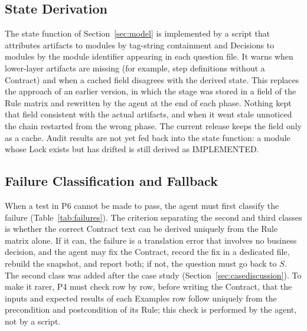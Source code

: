 \documentclass[conference]{IEEEtran}
\begin{document}
\subsection{State Derivation}\label{sec:state}

The state function of Section~\ref{sec:model} is implemented by a script that attributes artifacts to modules by tag-string containment and Decisions to modules by the module identifier appearing in each question file. It warns when lower-layer artifacts are missing (for example, step definitions without a Contract) and when a cached field disagrees with the derived state. This replaces the approach of an earlier version, in which the stage was stored in a field of the Rule matrix and rewritten by the agent at the end of each phase. Nothing kept that field consistent with the actual artifacts, and when it went stale unnoticed the chain restarted from the wrong phase. The current release keeps the field only as a cache. Audit results are not yet fed back into the state function: a module whose Lock exists but has drifted is still derived as IMPLEMENTED.

\subsection{Failure Classification and Fallback}\label{sec:failures}

When a test in P6 cannot be made to pass, the agent must first classify the failure (Table~\ref{tab:failures}). The criterion separating the second and third classes is whether the correct Contract text can be derived uniquely from the Rule matrix alone. If it can, the failure is a translation error that involves no business decision, and the agent may fix the Contract, record the fix in a dedicated file, rebuild the snapshot, and report both; if not, the question must go back to $S$. The second class was added after the case study (Section~\ref{sec:casediscussion}). To make it rarer, P4 must check row by row, before writing the Contract, that the inputs and expected results of each Examples row follow uniquely from the precondition and postcondition of its Rule; this check is performed by the agent, not by a script.
\end{document}
